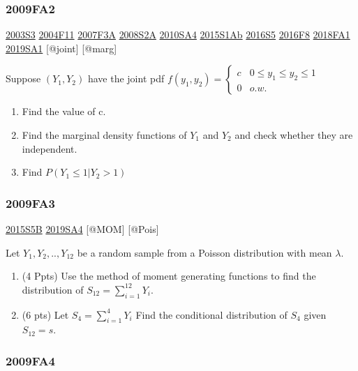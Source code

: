 \documentclass[6pt,Portrait]{article}
\begin{document}
\hypertarget{fa2}{%
\subsubsection{2009FA2}\label{fa2}}

\protect\hyperlink{s3}{2003S3} \protect\hyperlink{f11}{2004F11}
\protect\hyperlink{f3a}{2007F3A} \protect\hyperlink{s2a}{2008S2A}
\protect\hyperlink{sa4-1}{2010SA4} \protect\hyperlink{s1ab}{2015S1Ab}
\protect\hyperlink{s5-4}{2016S5} \protect\hyperlink{f8-4}{2016F8}
\protect\hyperlink{fa1-4}{2018FA1} \protect\hyperlink{sa1-3}{2019SA1}
{[}@joint{]} {[}@marg{]}

Suppose \((Y_1,Y_2)\) have the joint pdf
\(f(y_1,y_2)=\begin{cases}c&0\le y_1\le y_2\le 1\\0& o.w.\end{cases}\)

\begin{enumerate}
\def\labelenumi{(\alph{enumi})}
\item
  Find the value of c.
\item
  Find the marginal density functions of \(Y_1\) and \(Y_2\) and check
  whether they are independent.
\item
  Find \(P(Y_1\le1|Y_2>1)\)
\end{enumerate}

\hypertarget{fa3}{%
\subsubsection{2009FA3}\label{fa3}}

\protect\hyperlink{s5b-1}{2015S5B} \protect\hyperlink{sa4-3}{2019SA4}
{[}@MOM{]} {[}@Pois{]}

Let \(Y_1,Y_2,..,Y_{12}\) be a random sample from a Poisson distribution
with mean \(\lambda\).

\begin{enumerate}
\def\labelenumi{(\alph{enumi})}
\item
  (4 Ppts) Use the method of moment generating functions to find the
  distribution of \(S_{12}=\sum^{12}_{i=1} Y_i\).
\item
  (6 pts) Let \(S_4=\sum_{i=1}^4Y_i\) Find the conditional distribution
  of \(S_4\) given \(S_{12}=s\).
\end{enumerate}

\hypertarget{fa4}{%
\subsubsection{2009FA4}\label{fa4}}
\end{document}
